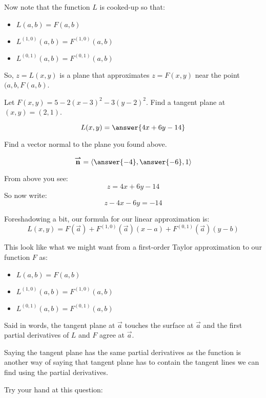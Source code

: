 \documentclass{ximera}
\begin{document}
Now note that the function $L$ is cooked-up so that:
\begin{itemize}
\item $L(a,b) = F(a,b)$
\item $L^{(1,0)} (a,b) = F^{(1,0)}(a,b)$
\item $L^{(0,1)} (a,b) = F^{(0,1)}(a,b)$
\end{itemize}
So, $z=L(x,y)$ is a plane that approximates $z=F(x,y)$  near
the point $(a,b,F(a,b)$.

\begin{question}
  Let $F(x,y) = 5-2(x-3)^2 -3(y-2)^2$. Find a tangent plane at $(x,y) = (2,1)$.
  \begin{prompt}
    \[
    L(x,y) = \answer{4x+6y-14}
    \]
  \end{prompt}
  \begin{question}
    Find a vector normal to the plane you found above.
    \begin{prompt}
    \[
    \vec{n} = \vector{\answer{-4},\answer{-6},1}
    \]
    \end{prompt}
    \begin{hint}
      From above you see:
      \[
      z=4x+6y-14
      \]
      So now write:
      \[
      z-4x-6y = -14
      \]
    \end{hint}
  \end{question}
\end{question}

Foreshadowing a bit, our formula for our linear approximation is:
\[
L(x,y) = F(\vec{a})+ F^{(1,0)}(\vec{a}) (x-a)+ F^{(0,1)}(\vec{a}) (y-b)
\]

This look like what we might want from a first-order Taylor
approximation to our function $F$ as:
\begin{itemize}
\item $L(a,b) = F(a,b)$
\item $L^{(1,0)} (a,b) = F^{(1,0)}(a,b)$
\item $L^{(0,1)} (a,b) = F^{(0,1)}(a,b)$
\end{itemize}
Said in words, the tangent plane at $\vec{a}$ touches the surface at
$\vec{a}$ and the first partial derivatives of $L$ and $F$ agree
at $\vec{a}$.

Saying the tangent plane has the same partial derivatives as the
function is another way of saying that tangent plane has to contain
the tangent lines we can find using the partial derivatives.



Try your hand at this question:
\end{document}
